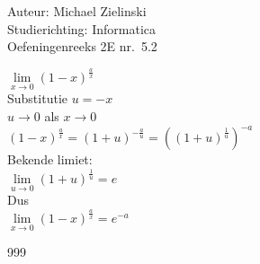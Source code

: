 \documentclass[a4paper]{article}
\begin{document}
\noindent \large Auteur: Michael Zielinski\\
\noindent \large Studierichting: Informatica\\
\noindent \large Oefeningenreeks 2E nr.\ 5.2\\
\medskip

\normalsize

$
  \lim\limits_{x \to 0}
  \left(1 - x\right)^{\tfrac{a}{x}}
$\\

Substitutie $u = -x$\\

$u \to 0$ als $x \to 0$\\

$\left(1 - x\right)^{\tfrac{a}{x}}
      =\left(1 + u\right)^{-\tfrac{a}{u}}
      =\left(\left(1 + u\right)^{\tfrac{1}{u}}\right)^{-a}$\\

Bekende limiet:\\

$
  \lim\limits_{u \to 0}
  \left(1 + u\right)^{\tfrac{1}{u}}
  = e$\\

Dus\\

$
  \lim\limits_{x \to 0}
  \left(1 - x\right)^{\tfrac{a}{x}}
  = e^{-a}$\\

\begin{thebibliography}{999}
\end{thebibliography}
\end{document}
